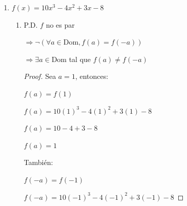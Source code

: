 \documentclass{article}
\begin{document}
\begin{enumerate}
\begin{enumerate}
\begin{enumerate}
\begin{proof}
                \(f(a) = -3a^3 + 2a\)
                
                \(f(a) = -a(3a^2 - 2)\)
                
                \vspace{\baselineskip}
                
                También:
                
                \(-f(-a) = -(-3(-a)^3 + 2(-a))\)
                
                \(-f(-a) = -(3a^3 - 2a)\)
                
                \(-f(-a) = -a(3a^2 - 2)\)
                \vspace{\baselineskip}
                
                Entonces:
                
                \(f(a) = -f(-a)\)
                \end{proof}
            \end{enumerate}
            \vspace{\baselineskip}
            
        \item[c)] \(f(x) = 10x^3 - 4x^2 + 3x - 8\)
            \begin{enumerate}
                \item[1.] P.D. \( f \) no es par
                
                \(\Rightarrow \neg(\forall a \in \text{Dom}, f(a) = f(-a))\)
                
                \(\Rightarrow \exists a \in \text{Dom}\) tal que \(f(a) \neq f(-a)\)
                
                \begin{proof} Sea \(a = 1\), entonces:
                
                \(f(a) = f(1)\)
                
                \(f(a) = 10(1)^3 - 4(1)^2 + 3(1) - 8\)
                
                \(f(a) = 10 - 4 + 3 - 8\)
                
                \(f(a) = 1\)
                \vspace{\baselineskip}
                
                También:
                
                \(f(-a) = f(-1)\)
                
                \(f(-a) = 10(-1)^3 - 4(-1)^2 + 3(-1) - 8\)
                

\end{proof}
\end{enumerate}
\end{enumerate}
\end{enumerate}
\end{document}
